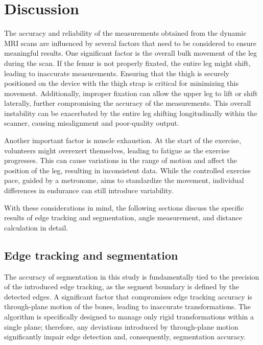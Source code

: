 \documentclass{micro-econ-thesis}
\begin{document}
\section{Discussion}

The accuracy and reliability of the measurements obtained from the dynamic MRI scans are influenced by several factors that need to be considered to ensure meaningful results. One significant factor is the overall bulk movement of the leg during the scan. If the femur is not properly fixated, the entire leg might shift, leading to inaccurate measurements. Ensuring that the thigh is securely positioned on the device with the thigh strap is critical for minimizing this movement. Additionally, improper fixation can allow the upper leg to lift or shift laterally, further compromising the accuracy of the measurements. This overall instability can be exacerbated by the entire leg shifting longitudinally within the scanner, causing misalignment and poor-quality output.

Another important factor is muscle exhaustion. At the start of the exercise, volunteers might overexert themselves, leading to fatigue as the exercise progresses. This can cause variations in the range of motion and affect the position of the leg, resulting in inconsistent data. While the controlled exercise pace, guided by a metronome, aims to standardize the movement, individual differences in endurance can still introduce variability.

With these considerations in mind, the following sections discuss the specific results of edge tracking and segmentation, angle measurement, and distance calculation in detail.

\subsection{Edge tracking and segmentation}
The accuracy of segmentation in this study is fundamentally tied to the precision of the introduced edge tracking, as the segment boundary is defined by the detected edges. A significant factor that compromises edge tracking accuracy is through-plane motion of the bones, leading to inaccurate transformations. The algorithm is specifically designed to manage only rigid transformations within a single plane; therefore, any deviations introduced by through-plane motion significantly impair edge detection and, consequently, segmentation accuracy.
\end{document}
